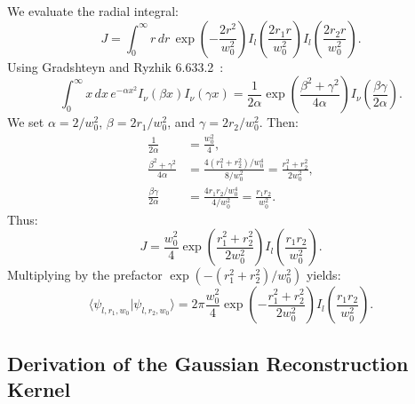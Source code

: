 \documentclass[11pt,a4paper]{article}
\begin{document}
We evaluate the radial integral:
\begin{equation}
J = \int_0^\infty r \, dr \, \exp\left( - \frac{2 r^2}{w_0^2} \right) I_l\left( \frac{2 r_1 r}{w_0^2} \right) I_l\left( \frac{2 r_2 r}{w_0^2} \right).
\end{equation}
Using Gradshteyn and Ryzhik 6.633.2~\cite{Gradshteyn2014}:
\begin{equation}
\int_0^\infty x \, dx \, e^{-\alpha x^2} I_\nu(\beta x) I_\nu(\gamma x) = \frac{1}{2\alpha} \exp\left( \frac{\beta^2 + \gamma^2}{4\alpha} \right) I_\nu\left( \frac{\beta \gamma}{2\alpha} \right).
\end{equation}
We set $\alpha = 2 / w_0^2$, $\beta = 2 r_1 / w_0^2$, and $\gamma = 2 r_2 / w_0^2$. Then:
\begin{align}
\frac{1}{2\alpha} &= \frac{w_0^2}{4}, \\
\frac{\beta^2 + \gamma^2}{4\alpha} &= \frac{4(r_1^2 + r_2^2) / w_0^4}{8 / w_0^2} = \frac{r_1^2 + r_2^2}{2 w_0^2}, \\
\frac{\beta \gamma}{2\alpha} &= \frac{4 r_1 r_2 / w_0^4}{4 / w_0^2} = \frac{r_1 r_2}{w_0^2}.
\end{align}
Thus:
\begin{equation}
J = \frac{w_0^2}{4} \exp\left( \frac{r_1^2 + r_2^2}{2 w_0^2} \right) I_l\left( \frac{r_1 r_2}{w_0^2} \right).
\end{equation}
Multiplying by the prefactor $\exp(-(r_1^2 + r_2^2)/w_0^2)$ yields:
\begin{equation}
\langle \psi_{l, r_1, w_0} | \psi_{l, r_2, w_0} \rangle = 2\pi \frac{w_0^2}{4} \exp\left( - \frac{r_1^2 + r_2^2}{2 w_0^2} \right) I_l\left( \frac{r_1 r_2}{w_0^2} \right).
\end{equation}

\subsection{Derivation of the Gaussian Reconstruction Kernel}
\end{document}
